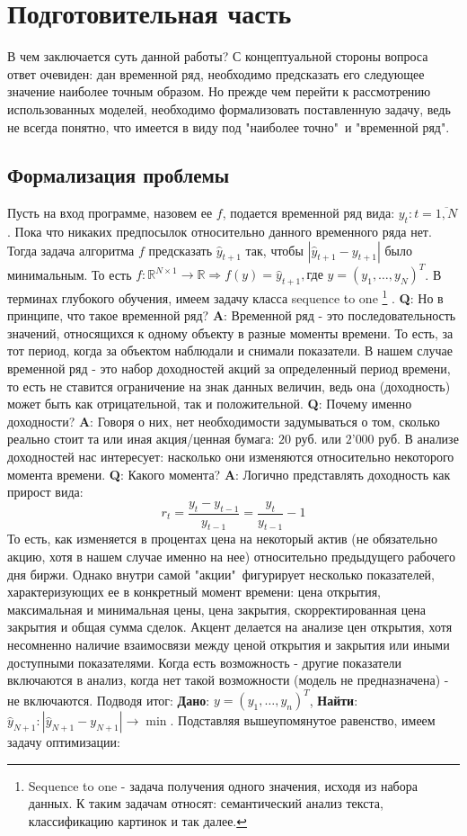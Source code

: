 \section{Подготовительная часть}
	В чем заключается суть данной работы? С концептуальной стороны вопроса ответ очевиден: дан временной ряд, необходимо предсказать его следующее значение наиболее точным образом. Но прежде чем перейти к рассмотрению использованных моделей, необходимо формализовать поставленную задачу, ведь не всегда понятно, что имеется в виду под "наиболее точно"\ и "временной ряд".
	\subsection{Формализация проблемы}
		Пусть на вход программе, назовем ее $f$, подается временной ряд вида: $y_t: t = \overline{1,N}$. Пока что никаких предпосылок относительно данного временного ряда нет. Тогда задача алгоритма $f$ предсказать $\hat{y}_{t + 1}$ так, чтобы $|\hat{y}_{t + 1} - y_{t + 1}|$ было минимальным. То есть $f: \mathbb{R}^{N \times 1} \to \mathbb{R} \Rightarrow f(y) = \hat{y}_{t + 1}, \text{где } y = \left(y_1,\ldots,y_N\right)^T$. В терминах глубокого обучения, имеем задачу класса sequence to one \footnote{Sequence to one - задача получения одного значения, исходя из набора данных. К таким задачам относят: семантический анализ текста, классификацию картинок и так далее.} . \textbf{Q}: Но в принципе, что такое временной ряд? \textbf{A}: Временной ряд - это последовательность значений, относящихся к одному объекту в разные моменты времени. То есть, за тот период, когда за объектом наблюдали и снимали показатели. В нашем случае временной ряд - это набор доходностей акций за определенный период времени, то есть не ставится ограничение на знак данных величин, ведь она (доходность) может быть как отрицательной, так и положительной. \textbf{Q}: Почему именно доходности? \textbf{A}: Говоря о них, нет необходимости задумываться о том, сколько реально стоит та или иная акция/ценная бумага: $20$ руб. или $2\text{'}000$ руб. В анализе доходностей нас интересует: насколько они изменяются относительно некоторого момента времени. \textbf{Q}: Какого момента? \textbf{A}: Логично представлять доходность как прирост вида:
		\begin{equation}
			r_{t} = \frac{y_{t} - y_{t - 1}}{y_{t - 1}} = \frac{y_{t}}{y_{t - 1}} - 1
		\end{equation}
		То есть, как изменяется в процентах цена на некоторый актив (не обязательно акцию, хотя в нашем случае именно на нее) относительно предыдущего рабочего дня биржи. Однако внутри самой "акции"\ фигурирует несколько показателей, характеризующих ее в конкретный момент времени: цена открытия, максимальная и минимальная цены, цена закрытия, скорректированная цена закрытия и общая сумма сделок. Акцент делается на анализе цен открытия, хотя несомненно наличие взаимосвязи между ценой открытия и закрытия или иными доступными показателями. Когда есть возможность - другие показатели включаются в анализ, когда нет такой возможности (модель не предназначена) - не включаются. Подводя итог: \textbf{Дано}: $y = \left(y_1, \ldots, y_n\right)^T$, \textbf{Найти}: $\hat{y}_{N + 1}: |\hat{y}_{N + 1} - y_{N + 1}| \to \min$. Подставляя вышеупомянутое равенство, имеем задачу оптимизации:
